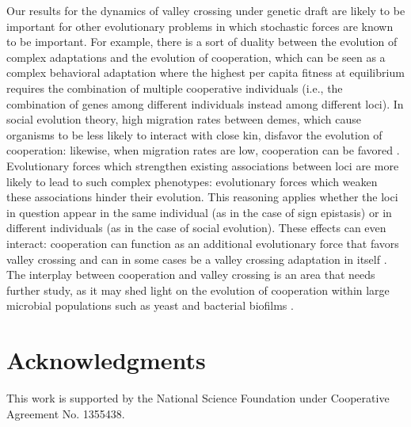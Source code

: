 \documentclass[rmp]{revtex4}
\begin{document}
\begin{spacing}{1.5}
Our results for the dynamics of valley crossing under genetic draft are likely to be important for other evolutionary problems in which stochastic forces are known to be important.
For example, there is a sort of duality between the evolution of complex adaptations and the evolution of cooperation, which can be seen as a complex behavioral adaptation where the highest per capita fitness at equilibrium requires the combination of multiple cooperative individuals (i.e., the combination of genes among different individuals instead among different loci).
In social evolution theory, high migration rates between demes, which cause organisms to be less likely to interact with close kin, disfavor the evolution of cooperation: likewise, when migration rates are low, cooperation can be favored \citep{Hamilton:1970,Rousset:2004,van_cleve_2015}.
Evolutionary forces which strengthen existing associations between loci are more likely to lead to such complex phenotypes: evolutionary forces which weaken these associations hinder their evolution.
This reasoning applies whether the loci in question appear in the same individual (as in the case of sign epistasis) or in different individuals (as in the case of social evolution).
These effects can even interact: cooperation can function as an additional evolutionary force that favors valley crossing \citep{Obolski:Lewin-Epstein:2017} and can in some cases be a valley crossing adaptation in itself \citep{van_cleve_2013}.
The interplay between cooperation and valley crossing is an area that needs further study, as it may shed light on the evolution of cooperation within large microbial populations such as yeast \citep{gore_2009, gore_2013} and bacterial biofilms \citep{rainey_2003, van_gestel_2014}.


\section*{Acknowledgments}

This work is supported by the National Science Foundation under Cooperative Agreement No. 1355438.



\end{spacing}
\end{document}
